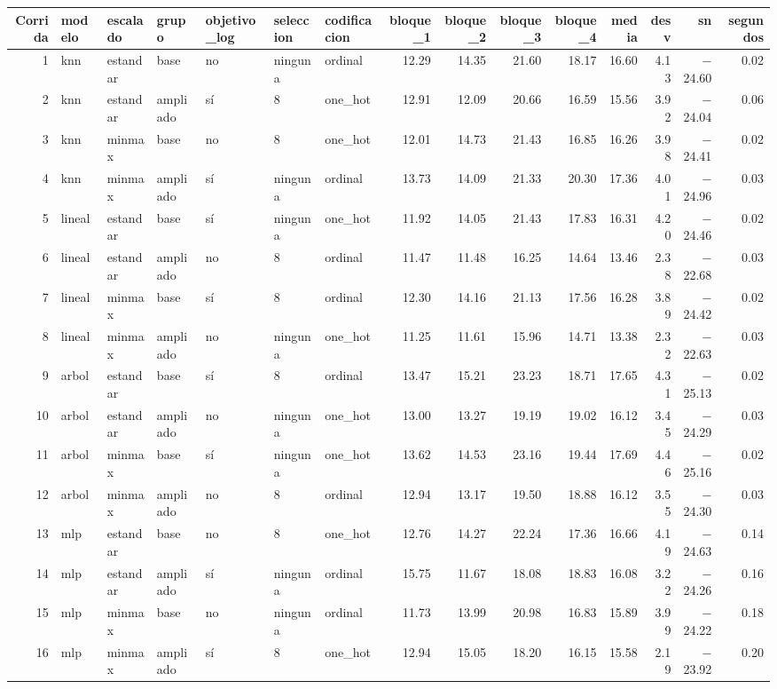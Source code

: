 \begin{tabular}{rllllllrrrrrrrr}
\toprule
Corrida & modelo & escalado & grupo & objetivo\_log & seleccion & codificacion & bloque\_1 & bloque\_2 & bloque\_3 & bloque\_4 & media & desv & sn & segundos \\
\midrule
1 & knn & estandar & base & no & ninguna & ordinal & 12.29 & 14.35 & 21.60 & 18.17 & 16.60 & 4.13 & $-$24.60 & 0.02 \\
2 & knn & estandar & ampliado & sí & 8 & one\_hot & 12.91 & 12.09 & 20.66 & 16.59 & 15.56 & 3.92 & $-$24.04 & 0.06 \\
3 & knn & minmax & base & no & 8 & one\_hot & 12.01 & 14.73 & 21.43 & 16.85 & 16.26 & 3.98 & $-$24.41 & 0.02 \\
4 & knn & minmax & ampliado & sí & ninguna & ordinal & 13.73 & 14.09 & 21.33 & 20.30 & 17.36 & 4.01 & $-$24.96 & 0.03 \\
5 & lineal & estandar & base & sí & ninguna & one\_hot & 11.92 & 14.05 & 21.43 & 17.83 & 16.31 & 4.20 & $-$24.46 & 0.02 \\
6 & lineal & estandar & ampliado & no & 8 & ordinal & 11.47 & 11.48 & 16.25 & 14.64 & 13.46 & 2.38 & $-$22.68 & 0.03 \\
7 & lineal & minmax & base & sí & 8 & ordinal & 12.30 & 14.16 & 21.13 & 17.56 & 16.28 & 3.89 & $-$24.42 & 0.02 \\
8 & lineal & minmax & ampliado & no & ninguna & one\_hot & 11.25 & 11.61 & 15.96 & 14.71 & 13.38 & 2.32 & $-$22.63 & 0.03 \\
9 & arbol & estandar & base & sí & 8 & ordinal & 13.47 & 15.21 & 23.23 & 18.71 & 17.65 & 4.31 & $-$25.13 & 0.02 \\
10 & arbol & estandar & ampliado & no & ninguna & one\_hot & 13.00 & 13.27 & 19.19 & 19.02 & 16.12 & 3.45 & $-$24.29 & 0.03 \\
11 & arbol & minmax & base & sí & ninguna & one\_hot & 13.62 & 14.53 & 23.16 & 19.44 & 17.69 & 4.46 & $-$25.16 & 0.02 \\
12 & arbol & minmax & ampliado & no & 8 & ordinal & 12.94 & 13.17 & 19.50 & 18.88 & 16.12 & 3.55 & $-$24.30 & 0.03 \\
13 & mlp & estandar & base & no & 8 & one\_hot & 12.76 & 14.27 & 22.24 & 17.36 & 16.66 & 4.19 & $-$24.63 & 0.14 \\
14 & mlp & estandar & ampliado & sí & ninguna & ordinal & 15.75 & 11.67 & 18.08 & 18.83 & 16.08 & 3.22 & $-$24.26 & 0.16 \\
15 & mlp & minmax & base & no & ninguna & ordinal & 11.73 & 13.99 & 20.98 & 16.83 & 15.89 & 3.99 & $-$24.22 & 0.18 \\
16 & mlp & minmax & ampliado & sí & 8 & one\_hot & 12.94 & 15.05 & 18.20 & 16.15 & 15.58 & 2.19 & $-$23.92 & 0.20 \\
\bottomrule
\end{tabular}
